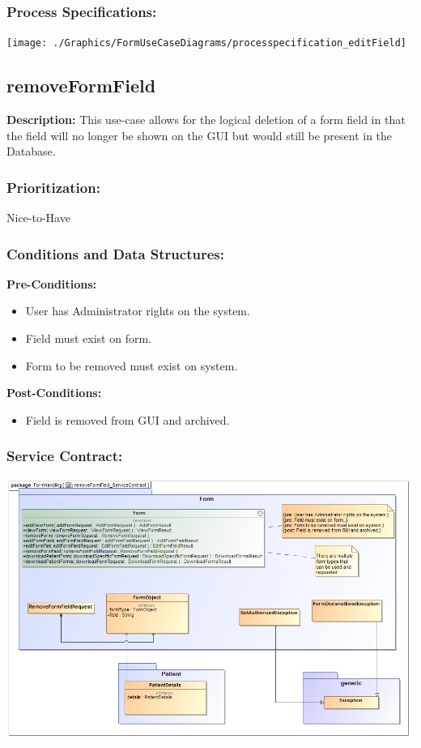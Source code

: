 \subsubsection{Process Specifications:} 
\texttt{[image: ./Graphics/FormUseCaseDiagrams/processpecification\_editField]}





\subsection{removeFormField}
\textbf{Description:}
This use-case allows for the logical deletion of a form field in that the field will no longer be shown on the GUI but would still be present in the Database.
\subsubsection{Prioritization:}
Nice-to-Have
\subsubsection{Conditions and Data Structures:}
\textbf{Pre-Conditions:}
\begin{itemize}
	\item User has Administrator rights on the system.
	\item Field must exist on form.
	\item Form to be removed must exist on system.
\end{itemize}

\textbf{Post-Conditions:}	
\begin{itemize}
	\item Field is removed from GUI and archived.  
\end{itemize}
\subsubsection{Service Contract:} 
\includegraphics[width=1\linewidth]{./Graphics/FormUseCaseDiagrams/removeFormField_ServiceContract}

